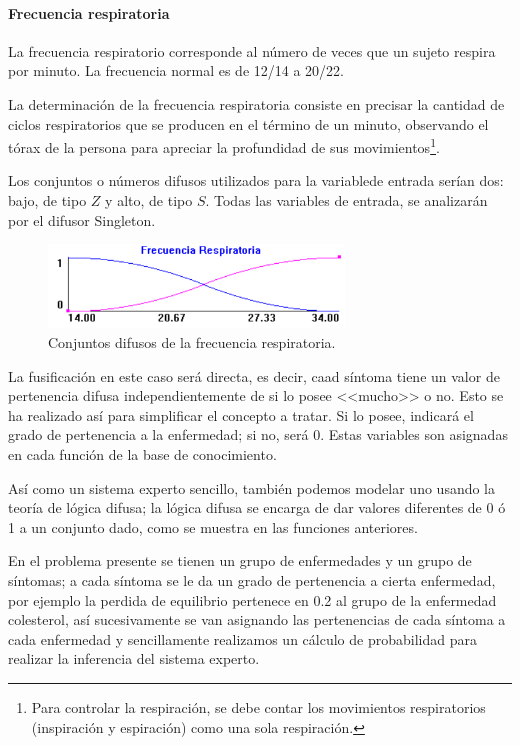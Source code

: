 \documentclass[a4paper, 11pt, titlepage]{article}
\begin{document}
        \paragraph{Frecuencia respiratoria} La frecuencia respiratorio corresponde al número de veces que 
        un sujeto respira por minuto. La frecuencia normal es de 12/14 a 20/22. 
        
        La determinación de la frecuencia respiratoria consiste  en  precisar  la  cantidad  de  ciclos 
        respiratorios  que  se producen  en  el  término  de  un  minuto,  observando  el  tórax  de  la  
        persona  para apreciar la profundidad de sus movimientos\footnote{
            Para controlar la respiración, se debe contar  los  movimientos  respiratorios  (inspiración  y  
            espiración)  como  una  sola respiración.
        }.

        Los conjuntos o números difusos utilizados para la variablede entrada serían dos: bajo, de tipo $Z$ y 
        alto, de tipo $S$. Todas las variables de entrada, se analizarán por el difusor Singleton.

        \begin{figure}[htp]
            \centering
            \includegraphics[width=0.7\textwidth]{resources/frecuenciarespiratoria.png}
            \caption{Conjuntos difusos de la frecuencia respiratoria.}
            \label{frecuenciarespiratoria}
        \end{figure}

        La fusificación en este caso será directa, es decir, caad síntoma tiene un valor de pertenencia difusa
        independientemente de si lo posee <<mucho>> o no. Esto se ha realizado así para simplificar el concepto 
        a tratar. Si lo posee, indicará el grado de pertenencia a la enfermedad; si no, será 0. Estas variables 
        son asignadas en cada función de la base de conocimiento.

        Así como un sistema experto sencillo, también podemos modelar uno usando la teoría de lógica difusa; 
        la lógica difusa se encarga de dar valores diferentes de 0 ó 1 a un conjunto dado, como se muestra 
        en las funciones anteriores.

        En el problema presente se tienen un grupo de enfermedades y un grupo de síntomas; a cada síntoma 
        se le da un grado de pertenencia a cierta enfermedad, por ejemplo la perdida de equilibrio pertenece 
        en 0.2 al grupo de la enfermedad colesterol, así sucesivamente se van asignando las pertenencias de
        cada síntoma a cada enfermedad y sencillamente realizamos un cálculo de probabilidad para realizar 
        la inferencia del sistema experto.
\end{document}
